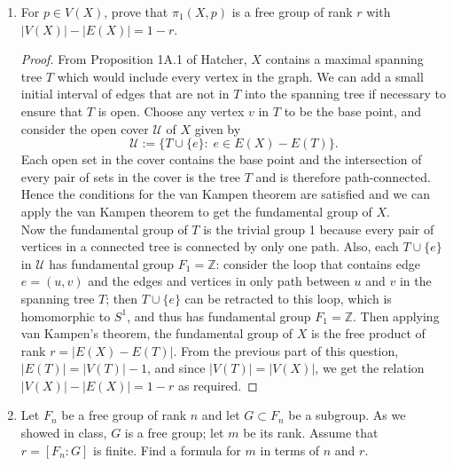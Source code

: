 \documentclass{article}
\begin{document}
\begin{enumerate}[label={\bf Q\arabic*:}]
\begin{enumerate}
      \item For $p\in V(X)$, prove that $\pi_1(X,p)$ is a free group of
        rank $r$ with $|V(X)|-|E(X)|=1-r$.
        \begin{proof}
          From Proposition 1A.1 of Hatcher, $X$ contains a maximal spanning
          tree $T$ which would include every vertex in the graph. We can
          add a small initial interval of edges that are not in $T$ into
          the spanning tree if necessary to ensure that $T$ is open. Choose
          any vertex $v$ in $T$ to be the base point, and consider the open
          cover $\mathcal{U}$ of $X$ given by
          \begin{equation*}
            \mathcal{U} := \{T\cup\{e\}:\; e\in E(X)-E(T)\}.
          \end{equation*}
          Each open set in the cover contains the base point and the
          intersection of every pair of sets in the cover is the tree $T$
          and is therefore path-connected. Hence the conditions for the van
          Kampen theorem are satisfied and we can apply the van Kampen
          theorem to get the fundamental group of $X$. \\

          Now the fundamental group of $T$ is the trivial group 1 because
          every pair of vertices in a connected tree is connected by only
          one path. Also, each $T\cup\{e\}$ in $\mathcal{U}$ has
          fundamental group $F_1=\mathbb{Z}$: consider the loop that
          contains edge $e=(u,v)$ and the edges and vertices in only path
          between $u$ and $v$ in the spanning tree $T$; then $T\cup\{e\}$
          can be retracted to this loop, which is homomorphic to $S^1$, and
          thus has fundamental group $F_1=\mathbb{Z}$. Then applying van
          Kampen's theorem, the fundamental group of $X$ is the free
          product of rank $r=|E(X)-E(T)|$. From the previous part of this
          question, $|E(T)|=|V(T)|-1$, and since $|V(T)|=|V(X)|$, we get
          the relation $|V(X)|-|E(X)|=1-r$ as required.
        \end{proof}

      \item Let $F_n$ be a free group of rank $n$ and let $G\subset F_n$ be
        a subgroup. As we showed in class, $G$ is a free group; let $m$ be
        its rank. Assume that $r=[F_n:G]$ is finite. Find a formula for $m$
        in terms of $n$ and $r$.


\end{enumerate}
\end{enumerate}
\end{document}

